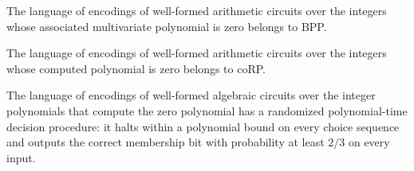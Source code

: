 \begin{theorem}
\label{Randomized.inBPP_ZEROP_polyTime}
\leanok
{}
The language of encodings of well-formed arithmetic circuits over the integers whose
associated multivariate polynomial is zero belongs to BPP.
\end{theorem}

\begin{theorem}
\label{Randomized.ZEROP_mem_coRP_PTM}
\leanok
{}
The language of encodings of well-formed arithmetic circuits over the integers whose
computed polynomial is zero belongs to coRP.
\end{theorem}

\begin{theorem}
\label{Randomized.ZEROP_mem_BPP_PTM}
\leanok
{}
The language of encodings of well-formed algebraic circuits over the integer polynomials
that compute the zero polynomial has a randomized polynomial-time decision procedure: it
halts within a polynomial bound on every choice sequence and outputs the correct
membership bit with probability at least $2/3$ on every input.
\end{theorem}
